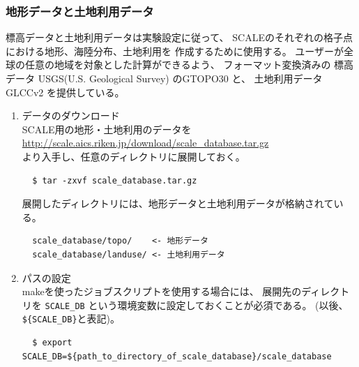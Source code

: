 \subsubsection{地形データと土地利用データ}
標高データと土地利用データは実験設定に従って、
SCALEのそれぞれの格子点における地形、海陸分布、土地利用を
作成するために使用する。
ユーザーが全球の任意の地域を対象とした計算ができるよう、
フォーマット変換済みの
標高データ USGS(U.S. Geological Survey) のGTOPO30 と、
土地利用データ GLCCv2 を提供している。

\begin{enumerate}
\item データのダウンロード\\
SCALE用の地形・土地利用のデータを\\
 \url{http://scale.aics.riken.jp/download/scale_database.tar.gz}\\
より入手し、任意のディレクトリに展開しておく。
\begin{verbatim}
  $ tar -zxvf scale_database.tar.gz
\end{verbatim}
展開したディレクトリには、地形データと土地利用データが格納されている。
\begin{verbatim}
  scale_database/topo/    <- 地形データ
  scale_database/landuse/ <- 土地利用データ
\end{verbatim}

\item パスの設定\\
makeを使ったジョブスクリプトを使用する場合には、
展開先のディレクトリを \verb|SCALE_DB| という環境変数に設定しておくことが必須である。
(以後、\verb|${SCALE_DB}|と表記)。
\begin{verbatim}
  $ export SCALE_DB=${path_to_directory_of_scale_database}/scale_database
\end{verbatim}
\end{enumerate}


